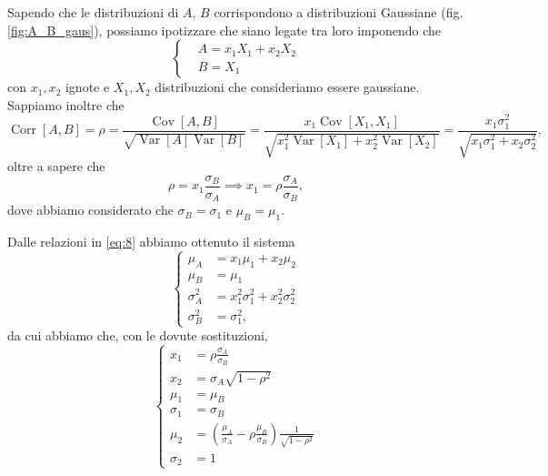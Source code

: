 \documentclass[a4paper,aps,12pt,tightenlines]{revtex4-2}
\DeclareMathOperator{\Corr}{Corr}
\DeclareMathOperator{\Cov}{Cov}
\DeclareMathOperator{\Var}{Var}
\begin{document}
Sapendo che le distribuzioni di $A$, $B$ corrispondono a distribuzioni Gaussiane (fig. \ref{fig:A_B_gaus}), possiamo ipotizzare che siano legate tra loro imponendo che \begin{equation} \left\{ 
    \begin{aligned}
        & A = x_1 X _1 + x_2 X_2\\
        & B = X_1
    \end{aligned}
\right.\label{eq:8}
\end{equation}
con $x_1, x_2$ ignote e $X_1, X_2$ distribuzioni che consideriamo essere gaussiane. Sappiamo inoltre che \begin{equation} \Corr[A,B] = \rho = \frac{\Cov[A,B]}{\sqrt{\Var[A]\Var[B]}} =  \frac{x_1\Cov[X_1, X_1]}{\sqrt{x_1^2\Var[X_1] + x_2^2\Var[X_2]}} = \frac{x_1\sigma_1^2}{\sqrt{x_1\sigma_1^2+x_2\sigma_2^2}},\end{equation} oltre a sapere che \begin{equation} \rho = x_1\frac{\sigma_B}{\sigma_A} \implies x_1 = \rho\frac{\sigma_A}{\sigma_B}, \end{equation} dove abbiamo considerato che $\sigma_B = \sigma_1$ e $\mu_B = \mu_1$. 

Dalle relazioni in \eqref{eq:8} abbiamo ottenuto il sistema \begin{equation}\left\{
    \begin{aligned}
        \mu_A &= x_1 \mu_1 + x_2 \mu_2\\
        \mu_B &= \mu_1\\
        \sigma_A^2 &= x_1^2\sigma_1^2 + x_2^2\sigma_2^2\\
        \sigma_B^2 &= \sigma_1^2,
    \end{aligned}
\right.
\end{equation}
da cui abbiamo che, con le dovute sostituzioni, \begin{equation}\left\{
    \begin{aligned} 
    x_1 &= \rho \frac{\sigma_A}{\sigma_B}\\
    x_2 &= \sigma_A \sqrt{1-\rho^2}\\
    \mu_1 &= \mu_B\\
    \sigma_1 &= \sigma_B\\
    \mu_2 & = \left(\frac{\mu_A}{\sigma_A} - \rho\frac{\mu_B}{\sigma_B}\right)\frac{1}{\sqrt{1-\rho^2}}\\
    \sigma_2 &= 1
    \end{aligned}
\right.
\end{equation}
\end{document}
